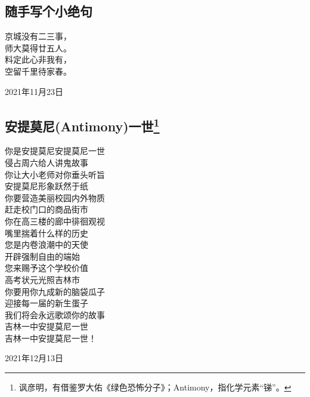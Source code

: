 \documentclass[a5paper]{ctexart}
\begin{document}
	\subsection{随手写个小绝句}
	\begin{center}
		京城没有二三事，\\
		师大莫得廿五人。\\
		料定此心非我有，\\
		空留千里待家春。
	\end{center}
	\hfill 2021年11月23日
	
	\subsection[安提莫尼(Antimony)一世]{安提莫尼(Antimony)一世\footnote{讽彦明，有借鉴罗大佑《绿色恐怖分子》；Antimony，指化学元素“锑”。}}
	\begin{center}
		你是安提莫尼安提莫尼一世\\
		侵占周六给人讲鬼故事\\
		你让大小老师对你垂头听旨\\
		安提莫尼形象跃然于纸\\
		你要营造美丽校园内外物质\\
		赶走校门口的商品街市\\
		你在高三楼的廊中徘徊观视\\
		嘴里揣着什么样的历史\\
		您是内卷浪潮中的天使\\
		开辟强制自由的端始\\
		您来赐予这个学校价值\\
		高考状元光照吉林市\\
		你要用你九成新的脑袋瓜子\\
		迎接每一届的新生蛋子\\
		我们将会永远歌颂你的故事\\
		吉林一中安提莫尼一世\\
		吉林一中安提莫尼一世！
	\end{center}
	\hfill 2021年12月13日
	
	
	
\end{document}
